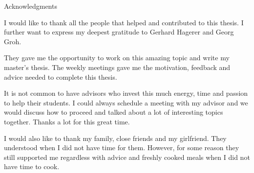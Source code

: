 \thispagestyle{empty}

\vspace*{20mm}

\begin{center}
{ Acknowledgments}
\end{center}

\vspace{10mm}

I would like to thank all the people that helped and contributed to this thesis. I further want to express my deepest gratitude to Gerhard Hagerer and Georg Groh. 
\medskip

They gave me the opportunity to work on this amazing topic and write my master's thesis. The weekly meetings gave me the motivation, feedback and advice needed to complete this thesis. 
\medskip

It is not common to have advisors who invest this much energy, time and passion to help their students. I could always schedule a meeting with my advisor and we would discuss how to proceed and talked about a lot of interesting topics together. Thanks a lot for this great time.
\medskip

I would also like to thank my family, close friends and my girlfriend. They understood when I did not have time for them. However, for some reason they still supported me regardless with advice and freshly cooked meals when I did not have time to cook.
\cleardoublepage{}
